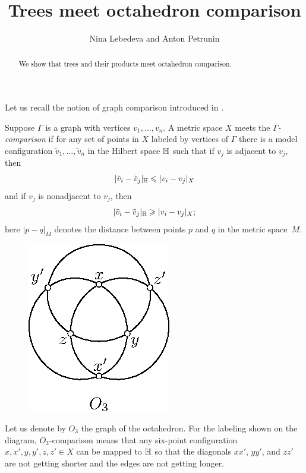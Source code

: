 \documentclass{article}
\begin{document}


\title{Trees meet octahedron comparison}
\author{Nina Lebedeva and Anton Petrunin}

\date{}
\maketitle
\begin{abstract}
We show that trees and their products meet octahedron comparison.
\end{abstract}


Let us recall the notion of graph comparison introduced in \cite{lebedeva-petrunin-zolotov}.

Suppose $\Gamma$ is a graph with vertices $v_1,\dots,v_n$.
A metric space $X$ meets the \emph{$\Gamma$-comparison} if for any set of points in $X$ labeled by vertices of $\Gamma$ there is a model configuration $\tilde v_1,\dots,\tilde v_n$ in the Hilbert space $\mathbb H$ such that 
if $v_j$ is adjacent to $v_j$, then
\[|\tilde v_i-\tilde v_j|_{\mathbb H}\leqslant | v_i-v_j|_{X}\]
and
if $v_j$ is nonadjacent to $v_j$, then
\[|\tilde v_i-\tilde v_j|_{\mathbb H}\geqslant | v_i-v_j|_{X};\]
here $|p-q|_M$ denotes the distance between points $p$ and $q$ in the metric space~$M$.

\begin{figure}
\vskip-2mm
\centering
\includegraphics{mppics/pic-30}
\end{figure}

Let us denote by $O_3$ the graph of the octahedron.
For the labeling shown on the diagram, $O_3$-comparison means that any six-point configuration $x,x',y,y',z,z'\in X$ can be mapped to $\mathbb H$ so that the diagonals $xx'$, $yy'$, and $zz'$ are not getting shorter
and the edges are not getting longer.
\end{document}
